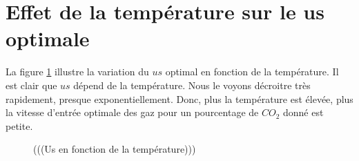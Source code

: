 \documentclass[11pt]{report}
\begin{document}
        \section{Effet de la température sur le us optimale}
            La figure \ref{graph:us/T} illustre la variation du $us$ optimal en fonction de la température.
            Il est clair que $us$ dépend de la température. 
            Nous le voyons décroitre très rapidement, presque exponentiellement.
            Donc, plus la température est élevée, plus la vitesse d'entrée
            optimale des gaz pour un pourcentage de $CO_2$ donné est petite.
            \begin{figure}[h]
                \centering
                
                \caption{(((Us en fonction de la température)))}
                \label{graph:us/T}
            \end{figure}
\end{document}
